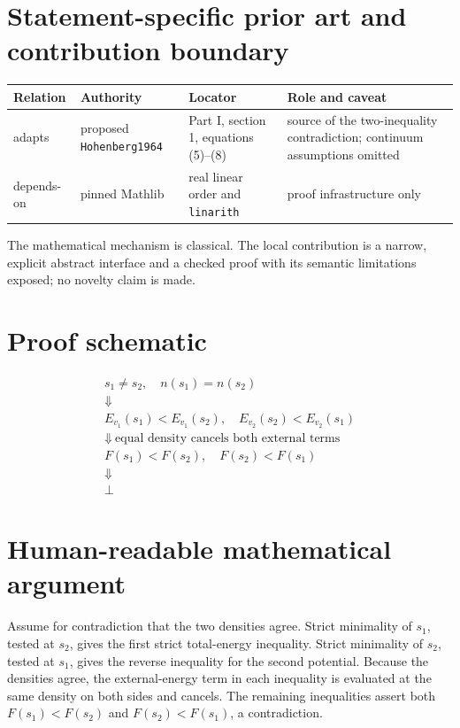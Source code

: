 \section{Statement-specific prior art and contribution boundary}
\begin{tabularx}{\textwidth}{@{}lYYY@{}}
\toprule
Relation & Authority & Locator & Role and caveat \\
\midrule
adapts & proposed \texttt{Hohenberg1964} & Part I, section 1, equations (5)--(8) & source of the two-inequality contradiction; continuum assumptions omitted \\
depends-on & pinned Mathlib & real linear order and \texttt{linarith} & proof infrastructure only \\
\bottomrule
\end{tabularx}
The mathematical mechanism is classical.  The local contribution is a narrow, explicit abstract
interface and a checked proof with its semantic limitations exposed; no novelty claim is made.

\section{Proof schematic}
\[
\begin{array}{c}
 s_1\ne s_2,\quad n(s_1)=n(s_2)\\[2pt]
 \Downarrow\\
 E_{v_1}(s_1)<E_{v_1}(s_2),\quad E_{v_2}(s_2)<E_{v_2}(s_1)\\[2pt]
 \Downarrow\ \text{equal density cancels both external terms}\\
 F(s_1)<F(s_2),\quad F(s_2)<F(s_1)\\[2pt]
 \Downarrow\\
 \bot
\end{array}
\]

\section{Human-readable mathematical argument}
Assume for contradiction that the two densities agree.  Strict minimality of \(s_1\), tested at
\(s_2\), gives the first strict total-energy inequality.  Strict minimality of \(s_2\), tested at
\(s_1\), gives the reverse inequality for the second potential.  Because the densities agree, the
external-energy term in each inequality is evaluated at the same density on both sides and
cancels.  The remaining inequalities assert both \(F(s_1)<F(s_2)\) and
\(F(s_2)<F(s_1)\), a contradiction.

